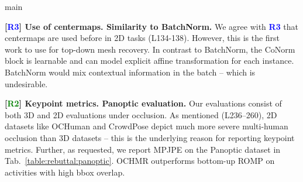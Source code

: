 main\documentclass[10pt,twocolumn,letterpaper]{article}
\newcommand{\Rtwo}{\textcolor{Green}{R2}}
\newcommand{\Rthree}{\textcolor{Blue}{R3}}
\begin{document}
\vspace{1.0mm}\noindent
\textbf{[\Rthree] Use of centermaps. Similarity to BatchNorm.} We agree with \textbf{\Rthree} that centermaps are used before in 2D tasks (L134-138). However, this is the first work to use for top-down mesh recovery. In contrast to BatchNorm, the CoNorm block is learnable and can model explicit affine transformation for each instance. BatchNorm would mix contextual information in the batch -- which is undesirable.


\vspace{1.2mm}\noindent
\textbf{[\Rtwo] Keypoint metrics. Panoptic evaluation.} Our evaluations consist of both 3D and 2D evaluations under occlusion. As mentioned (L236--260), 2D datasets like OCHuman and CrowdPose depict much more severe multi-human occlusion than 3D datasets -- this is the underlying reason for reporting keypoint metrics. Further, as requested, we report MPJPE on the Panoptic dataset in Tab.~\ref{table:rebuttal:panoptic}. OCHMR outperforms bottom-up ROMP on activities with high bbox overlap. 

\begin{table}[b]
\captionsetup{font=scriptsize}
\begin{center}
\vspace*{-0.2in}
\vspace*{-0.1in}
\caption{We report MPJPE on the CMU-Panoptic benchmark. All methods are trained using same data for a fair comparison.}
 \vspace*{-0.6in}
\label{table:rebuttal:panoptic}
\end{center}
\end{table}
 
\end{document}
